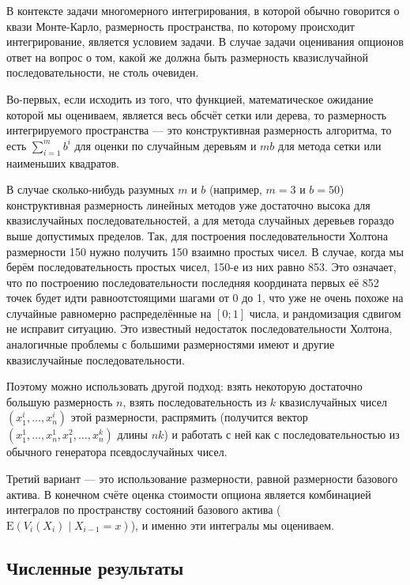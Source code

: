 \documentclass[specialist,
               substylefile = ../spbu.rtx,
               subf,href,colorlinks=true, 12pt]{disser}
\newcommand{\E}{\mathrm{E}}
\begin{document}
В контексте задачи многомерного интегрирования, в которой обычно говорится о квази Монте-Карло, размерность пространства, по которому происходит интегрирование, является условием задачи. В случае задачи оценивания опционов ответ на вопрос о том, какой же должна быть размерность квазислучайной последовательности, не столь очевиден.

Во-первых, если исходить из того, что функцией, математическое ожидание которой мы оцениваем, является весь обсчёт сетки или дерева, то размерность интегрируемого пространства --- это конструктивная размерность алгоритма, то есть $\sum_{i=1}^m b^i$ для оценки по случайным деревьям и $mb$ для метода сетки или наименьших квадратов.

В случае сколько-нибудь разумных $m$ и $b$ (например, $m = 3$ и $b = 50$) конструктивная размерность линейных методов уже достаточно высока для квазислучайных последовательностей, а для метода случайных деревьев гораздо выше допустимых пределов. Так, для построения последовательности Холтона размерности 150 нужно получить 150 взаимно простых чисел. В случае, когда мы берём последовательность простых чисел, 150-е из них равно 853. Это означает, что по построению последовательности последняя координата первых её 852 точек будет идти равноотстоящими шагами от 0 до 1, что уже не очень похоже на случайные равномерно распределённые на $\left[0; 1\right]$ числа, и рандомизация сдвигом не исправит ситуацию. Это известный недостаток последовательности Холтона, аналогичные проблемы с большими размерностями имеют и другие квазислучайные последовательности.

Поэтому можно использовать другой подход: взять некоторую достаточно большую размерность $n$, взять последовательность из $k$ квазислучайных чисел $\left(x_1^i, \dots, x_n^i\right)$  этой размерности, распрямить (получится вектор $\left(x_1^1, \dots, x_n^1, x_1^2, \dots, x_n^k\right)$ длины $nk$) и работать с ней как с последовательностью из обычного генератора псевдослучайных чисел.

Третий вариант --- это использование размерности, равной размерности базового актива. В конечном счёте оценка стоимости опциона является комбинацией интегралов по пространству состояний базового актива ($\E\left(V_i(X_i)\middle\vert X_{i-1} = x\right)$), и именно эти интегралы мы оцениваем.


\subsection{Численные результаты} %
\label{sub:numerical_results}
\end{document}
